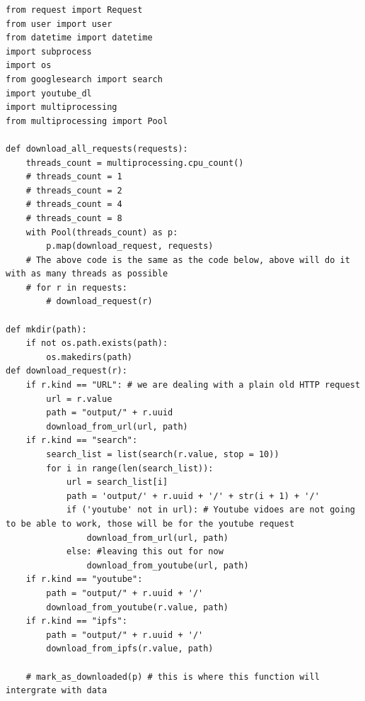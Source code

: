 \documentclass{article}
\begin{document}
\begin{verbatim}
from request import Request
from user import user
from datetime import datetime
import subprocess
import os
from googlesearch import search
import youtube_dl
import multiprocessing
from multiprocessing import Pool

def download_all_requests(requests):
    threads_count = multiprocessing.cpu_count()
    # threads_count = 1
    # threads_count = 2    
    # threads_count = 4
    # threads_count = 8
    with Pool(threads_count) as p:
        p.map(download_request, requests)
    # The above code is the same as the code below, above will do it with as many threads as possible
    # for r in requests:
        # download_request(r)

def mkdir(path):
    if not os.path.exists(path):
        os.makedirs(path)    
def download_request(r):
    if r.kind == "URL": # we are dealing with a plain old HTTP request
        url = r.value
        path = "output/" + r.uuid
        download_from_url(url, path)
    if r.kind == "search":
        search_list = list(search(r.value, stop = 10))
        for i in range(len(search_list)):
            url = search_list[i]
            path = 'output/' + r.uuid + '/' + str(i + 1) + '/'
            if ('youtube' not in url): # Youtube vidoes are not going to be able to work, those will be for the youtube request
                download_from_url(url, path)
            else: #leaving this out for now
                download_from_youtube(url, path)
    if r.kind == "youtube":
        path = "output/" + r.uuid + '/'
        download_from_youtube(r.value, path)
    if r.kind == "ipfs":
        path = "output/" + r.uuid + '/'
        download_from_ipfs(r.value, path)

    # mark_as_downloaded(p) # this is where this function will intergrate with data


\end{verbatim}
\end{document}

